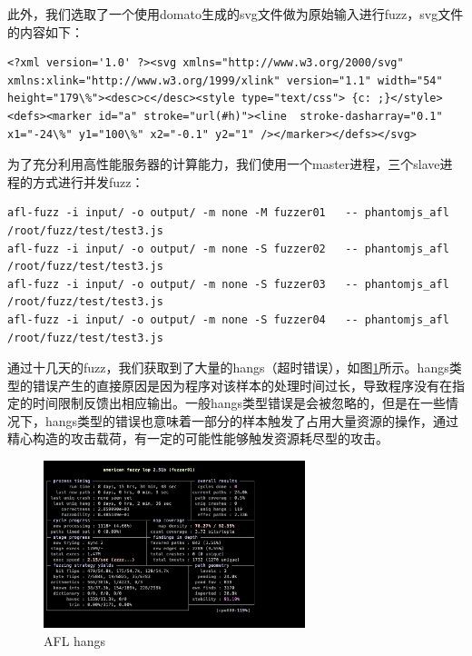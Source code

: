 \documentclass[doctor,privacy,twoside]{buaa_mac}
\begin{document}
此外，我们选取了一个使用domato生成的svg文件做为原始输入进行fuzz，svg文件的内容如下：
\lstset{language=JavaScript}
\begin{lstlisting}
<?xml version='1.0' ?><svg xmlns="http://www.w3.org/2000/svg" xmlns:xlink="http://www.w3.org/1999/xlink" version="1.1" width="54" height="179\%"><desc>c</desc><style type="text/css"> {c: ;}</style><defs><marker id="a" stroke="url(#h)"><line  stroke-dasharray="0.1" x1="-24\%" y1="100\%" x2="-0.1" y2="1" /></marker></defs></svg>
\end{lstlisting}

为了充分利用高性能服务器的计算能力，我们使用一个master进程，三个slave进程的方式进行并发fuzz：

\lstset{language=JavaScript}
\begin{lstlisting}
afl-fuzz -i input/ -o output/ -m none -M fuzzer01   -- phantomjs_afl /root/fuzz/test/test3.js
afl-fuzz -i input/ -o output/ -m none -S fuzzer02   -- phantomjs_afl /root/fuzz/test/test3.js
afl-fuzz -i input/ -o output/ -m none -S fuzzer03   -- phantomjs_afl /root/fuzz/test/test3.js
afl-fuzz -i input/ -o output/ -m none -S fuzzer04   -- phantomjs_afl /root/fuzz/test/test3.js
\end{lstlisting}

通过十几天的fuzz，我们获取到了大量的hangs（超时错误），如图\ref{fig:hangs}所示。hangs类型的错误产生的直接原因是因为程序对该样本的处理时间过长，导致程序没有在指定的时间限制反馈出相应输出。一般hangs类型错误是会被忽略的，但是在一些情况下，hangs类型的错误也意味着一部分的样本触发了占用大量资源的操作，通过精心构造的攻击载荷，有一定的可能性能够触发资源耗尽型的攻击。

\centerline{}
\begin{figure}[!h]
  \centering
  \includegraphics[width=0.68\textwidth]{images/afl_hangs.png}
  \caption{AFL hangs}
  \label{fig:hangs}
\end{figure}
\end{document}
